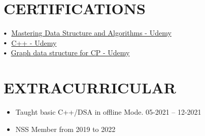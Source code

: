 \documentclass[letterpaper,11pt]{article}
\makeatletter
\newcommand{\resumeItem}[1]{
  \item\small{
    {#1 \vspace{-2pt}}
  }
}
\newcommand{\resumeSubheading}[4]{
  \vspace{-2pt}\item
    \begin{tabular*}{1.0\textwidth}[t]{l@{\extracolsep{\fill}}r}
      \textbf{\large#1} & \textbf{\small #2} \\
      \textit{\large#3} & \textit{\small #4} \\
      
    \end{tabular*}\vspace{-7pt}
}
\newcommand{\resumeSubHeadingListStart}{\begin{itemize}[leftmargin=0.0in, label={}]}
\newcommand{\resumeSubHeadingListEnd}{\end{itemize}}
\newcommand{\resumeItemListStart}{\begin{itemize}}
\newcommand{\resumeItemListEnd}{\end{itemize}\vspace{-5pt}}
\newcommand\sbullet[1][.5]{\mathbin{\vcenter{\hbox{\scalebox{#1}{$\bullet$}}}}}
\makeatother
\begin{document}
\section{CERTIFICATIONS}

$\sbullet[.75] \hspace{0.1cm}$ {\href{https://www.udemy.com/certificate/UC-c0e8dc21-8e8b-4f6e-9d05-5d109a9523cd/}{Mastering Data Structure and Algorithms - Udemy}} \hspace{2.59cm}\\
$\sbullet[.75] \hspace{0.1cm}$ {\href{https://www.udemy.com/certificate/UC-b732c216-80d9-448c-b5fd-42b4aa7ca0ee/}{C++ - Udemy}} \hspace{1.6cm}\\
$\sbullet[.75] \hspace{0.2cm}${\href{certificateLink.com}{Graph data structure for CP - Udemy}} \hspace{1cm}\\




 \section{EXTRACURRICULAR}
    \resumeSubHeadingListStart
        
            \resumeItemListStart
                \resumeItem{\normalsize{Taught basic C++/DSA in offline Mode.          05-2021 -- 12-2021}}
                \resumeItem{\normalsize{NSS Member from 2019 to 2022 }}
            \resumeItemListEnd
    \resumeSubHeadingListEnd
 \vspace{-11pt}
 
 
\end{document}

